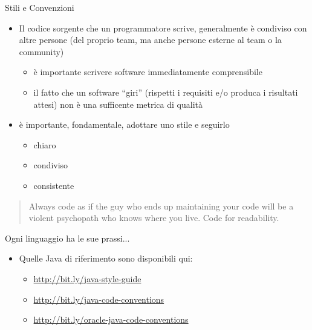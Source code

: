\documentclass[xcolor=dvipsnames,presentation]{beamer}
\begin{document}
\begin{frame}[allowframebreaks]{Stili e Convenzioni}
    \begin{itemize}\itemsep10pt
        \item Il codice sorgente che un programmatore scrive, generalmente è condiviso con altre persone (del proprio team, ma anche persone esterne al team o la community)
        \begin{itemize}
            \item è importante scrivere software immediatamente comprensibile
            \item il fatto che un software ``giri'' (rispetti i requisiti e/o produca i risultati attesi) non è una sufficente metrica di qualità
        \end{itemize}
        \item è importante, fondamentale, adottare uno stile e seguirlo
        \begin{itemize}
            \item chiaro
            \item condiviso
            \item consistente
        \end{itemize}
    \end{itemize}

\begin{block}{}
\begin{quote}
Always code as if the guy who ends up maintaining your code will be a violent psychopath who knows where you live. Code for readability.
\end{quote}
\end{block}

\begin{block}{Ogni linguaggio ha le sue prassi...}
\begin{itemize}
        \item Quelle Java di riferimento sono disponibili qui:
        \tiny
        \begin{itemize}
            \item \url{http://bit.ly/java-style-guide}
            \item \url{http://bit.ly/java-code-conventions}
            \item \url{http://bit.ly/oracle-java-code-conventions}
        \end{itemize}
    \end{itemize}
\end{block}


\end{frame}
\end{document}
